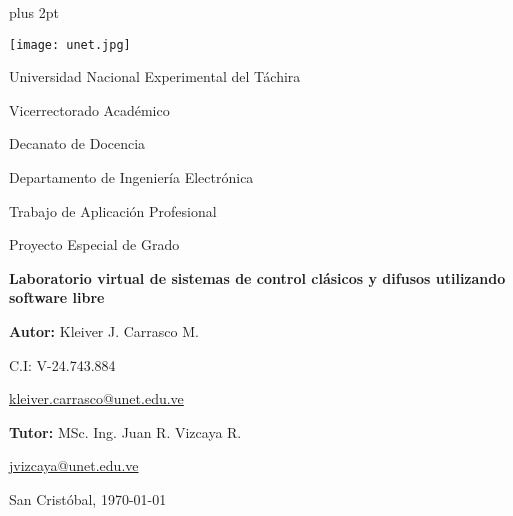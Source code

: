 \begin{titlepage}
	\parskip=7.25pt plus 2pt
	\begin{center}
		\texttt{[image: unet.jpg]}
		
		Universidad Nacional Experimental del Táchira 
		
		Vicerrectorado Académico
		
		Decanato de Docencia
		
		Departamento de Ingeniería Electrónica
		
		Trabajo de Aplicación Profesional
		
		Proyecto Especial de Grado
	\end{center}
	
	\centering
		\vspace{2.5cm}
		\vfill
		{\Large \textbf{Laboratorio virtual de sistemas de control clásicos y difusos utilizando software libre}\par}
	
	\vfill
	\begin{flushright}
		\begin{spacing}{1.5}
			\textbf{Autor:} Kleiver J. Carrasco M.
			
			C.I: V-24.743.884
			
			\href{kleiver.carrasco@unet.edu.ve}{kleiver.carrasco@unet.edu.ve}
			
			\textbf{Tutor:} MSc. Ing. Juan R. Vizcaya R.
			
			\href{jvizcaya@unet.edu.ve}{jvizcaya@unet.edu.ve}
		\end{spacing}	
	\end{flushright}
	
	\vfill
		San Cristóbal, \monthyeardate\today
	\leavevmode
	\end{titlepage}